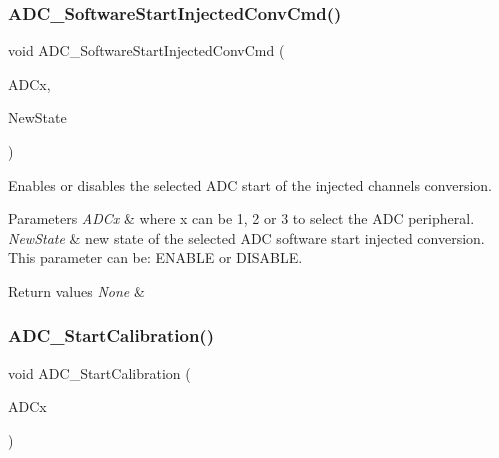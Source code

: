 \subsubsection{\texorpdfstring{ADC\_SoftwareStartInjectedConvCmd()}{ADC\_SoftwareStartInjectedConvCmd()}}
{\footnotesize\ttfamily void A\+D\+C\+\_\+\+Software\+Start\+Injected\+Conv\+Cmd (\begin{DoxyParamCaption}\item[{\mbox{\hyperlink{struct_a_d_c___type_def}{A\+D\+C\+\_\+\+Type\+Def}} $\ast$}]{A\+D\+Cx,  }\item[{\mbox{\hyperlink{group___exported__types_gac9a7e9a35d2513ec15c3b537aaa4fba1}{Functional\+State}}}]{New\+State }\end{DoxyParamCaption})}



Enables or disables the selected A\+DC start of the injected channels conversion. 


\begin{DoxyParams}{Parameters}
{\em A\+D\+Cx} & where x can be 1, 2 or 3 to select the A\+DC peripheral. \\
\hline
{\em New\+State} & new state of the selected A\+DC software start injected conversion. This parameter can be\+: E\+N\+A\+B\+LE or D\+I\+S\+A\+B\+LE. \\
\hline
\end{DoxyParams}

\begin{DoxyRetVals}{Return values}
{\em None} & \\
\hline
\end{DoxyRetVals}
\mbox{\label{group___a_d_c___exported___functions_gadcba6341124a6aabfd2dd885ca8e5f14}} 
\subsubsection{\texorpdfstring{ADC\_StartCalibration()}{ADC\_StartCalibration()}}
{\footnotesize\ttfamily void A\+D\+C\+\_\+\+Start\+Calibration (\begin{DoxyParamCaption}\item[{\mbox{\hyperlink{struct_a_d_c___type_def}{A\+D\+C\+\_\+\+Type\+Def}} $\ast$}]{A\+D\+Cx }\end{DoxyParamCaption})}



